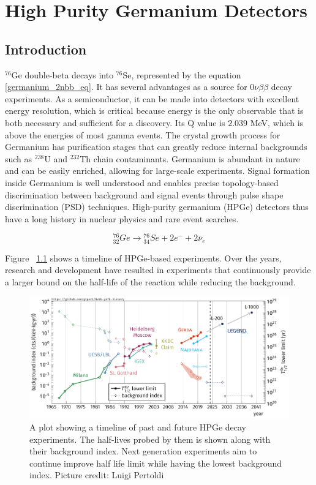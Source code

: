 \chapter{High Purity Germanium Detectors}
\label{chap:detectors}

\section{Introduction}
${}^{76}$Ge double-beta decays into ${}^{76}$Se, represented by the equation \ref{germanium_2nbb_eq}. It has several advantages as a source for $0\nu\beta\beta$ decay experiments. As a semiconductor, it can be made into detectors with excellent energy resolution, which is critical because energy is the only observable that is both necessary and sufficient for a discovery. Its Q value is $2.039$ MeV, which is above the energies of most gamma events. The crystal growth process for Germanium has purification stages that can greatly reduce internal backgrounds such as $^{238}$U and $^{232}$Th chain contaminants. Germanium is abundant in nature and can be easily enriched, allowing for large-scale experiments. Signal formation inside Germanium is well understood and enables precise topology-based discrimination between background and signal events through pulse shape discrimination (PSD) techniques. High-purity germanium (HPGe) detectors thus have a long history in nuclear physics and rare event searches.


\begin{equation}\label{germanium_2nbb_eq}
{}_{32}^{76}Ge \rightarrow {}_{34}^{76}Se + 2e^- + 2\bar{\nu}_e
\end{equation}

Figure ~\ref{past_ge_exp} shows a timeline of HPGe-based experiments. Over the years, research and development have resulted in experiments that continuously provide a larger bound on the half-life of the reaction while reducing the background. 

\begin{figure}[!htb]
\centering
\includegraphics[trim=0.1cm 0 0.1cm 0,clip, width=0.99\linewidth]{ch2/figs/0nbb-ge76-history-future.pdf}
\caption{A plot showing a timeline of past and future HPGe {\onbb} decay experiments. The half-lives probed by them is shown along with their background index. Next generation experiments aim to continue improve half life limit while having the lowest background index. Picture credit: Luigi Pertoldi}
\label{past_ge_exp}
\end{figure}


